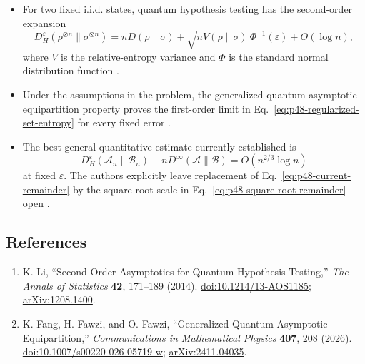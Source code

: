 \begin{itemize}
  \item For two fixed i.i.d. states, quantum hypothesis testing has the
  second-order expansion
  \begin{equation}
    D_H^\varepsilon(\rho^{\otimes n}\|\sigma^{\otimes n})
    =nD(\rho\|\sigma)
     +\sqrt{nV(\rho\|\sigma)}\,\Phi^{-1}(\varepsilon)+O(\log n),
    \label{eq:p48-iid-second-order}
  \end{equation}
  where $V$ is the relative-entropy variance and $\Phi$ is the standard
  normal distribution function
  .

  \item Under the assumptions in the problem, the generalized quantum
  asymptotic equipartition property proves the first-order limit in
  Eq.~\eqref{eq:p48-regularized-set-entropy} for every fixed error
  .

  \item The best general quantitative estimate currently established is
  \begin{equation}
    D_H^\varepsilon(\mathcal A_n\|\mathcal B_n)
    -nD^\infty(\mathcal A\|\mathcal B)
    =O(n^{2/3}\log n)
    \label{eq:p48-current-remainder}
  \end{equation}
  at fixed $\varepsilon$.  The authors explicitly leave replacement of
  Eq.~\eqref{eq:p48-current-remainder} by the square-root scale in
  Eq.~\eqref{eq:p48-square-root-remainder} open
  .
\end{itemize}

\subsection*{References}

\begin{enumerate}[label={},leftmargin=4.8em,labelsep=0.5em]
  \footnotesize
  \item[\textup{[Li14]}]\label{ref:p48-li}
  K. Li, ``Second-Order Asymptotics for Quantum Hypothesis Testing,''
  \emph{The Annals of Statistics} \textbf{42}, 171--189 (2014).
  \href{https://doi.org/10.1214/13-AOS1185}{doi:10.1214/13-AOS1185};
  \href{https://arxiv.org/abs/1208.1400}{arXiv:1208.1400}.

  \item[\textup{[FFF26]}]\label{ref:p48-fang-fawzi-fawzi}
  K. Fang, H. Fawzi, and O. Fawzi,
  ``Generalized Quantum Asymptotic Equipartition,''
  \emph{Communications in Mathematical Physics} \textbf{407}, 208 (2026).
  \href{https://doi.org/10.1007/s00220-026-05719-w}{doi:10.1007/s00220-026-05719-w};
  \href{https://arxiv.org/abs/2411.04035}{arXiv:2411.04035}.
\end{enumerate}

